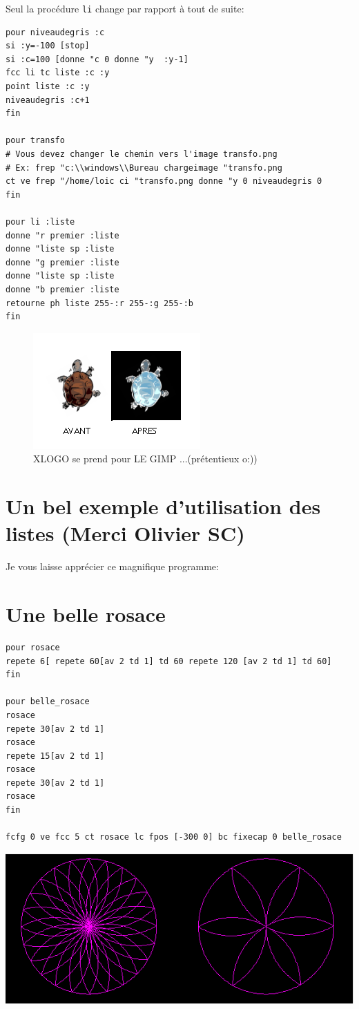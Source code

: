 Seul la procédure \texttt{li} change par rapport à tout de suite:
\pagebreak
\begin{verbatim}
pour niveaudegris :c
si :y=-100 [stop]
si :c=100 [donne "c 0 donne "y  :y-1] 
fcc li tc liste :c :y
point liste :c :y
niveaudegris :c+1
fin

pour transfo
# Vous devez changer le chemin vers l'image transfo.png 
# Ex: frep "c:\\windows\\Bureau chargeimage "transfo.png 
ct ve frep "/home/loic ci "transfo.png donne "y 0 niveaudegris 0
fin

pour li :liste
donne "r premier :liste
donne "liste sp :liste
donne "g premier :liste
donne "liste sp :liste
donne "b premier :liste
retourne ph liste 255-:r 255-:g 255-:b  
fin

\end{verbatim} 
\begin{figure}[h]
\includegraphics{bildoj/transfo2.png}
\caption{XLOGO se prend pour LE GIMP ...(prétentieux o:))}
\end{figure}

\section{Un bel exemple d'utilisation des listes (Merci Olivier SC)}

Je vous laisse apprécier ce magnifique programme:


\section{Une belle rosace}
\begin{verbatim}
pour rosace
repete 6[ repete 60[av 2 td 1] td 60 repete 120 [av 2 td 1] td 60]
fin

pour belle_rosace
rosace 
repete 30[av 2 td 1]
rosace
repete 15[av 2 td 1]
rosace
repete 30[av 2 td 1]
rosace
fin

fcfg 0 ve fcc 5 ct rosace lc fpos [-300 0] bc fixecap 0 belle_rosace
\end{verbatim} 
\includegraphics[width=14cm]{bildoj/rosace2.png}

